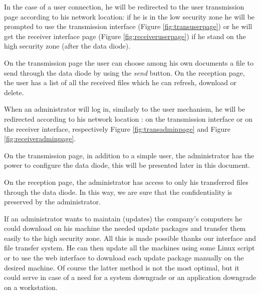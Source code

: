 \documentclass[a4paper,10pt]{article}
\begin{document}
In the case of a user connection, he will be redirected to the user transmission page according to his network location: if he is in the low security zone he will be prompted to use the transmission interface (Figure \ref{fig:transuserpage}) or he will get the receiver interface page (Figure \ref{fig:receiveruserpage}) if he stand on the high security zone (after the data diode). 

On the transmission page the user can choose among his own documents a file to send through the data diode by using the \textit{send} button. On the reception page, the user has a list of all the received files which he can refresh, download or delete.\bigskip 

When an administrator will log in, similarly to the user mechanism, he will be redirected according to his network location : on the transmission interface or on the receiver interface, respectively Figure \ref{fig:transadminpage} and Figure \ref{fig:receiveradminpage}.

On the transmission page, in addition to a simple user, the administrator has the power to configure the data diode, this will be presented later in this document.

On the reception page, the administrator has access to only his transferred files through the data diode. In this way, we are sure that the confidentiality is preserved by the administrator.  

If an administrator wants to maintain (updates) the company's computers he could download on his machine the needed update packages and transfer them easily to the high security zone. All this is made possible thanks our interface and file transfer system. He can then update all the machines using some Linux script or to use the web interface to download each update package manually on the desired machine. Of course the latter method is not the most optimal, but it could serve in case of a need for a system downgrade or an application downgrade on a workstation. 
\end{document}
